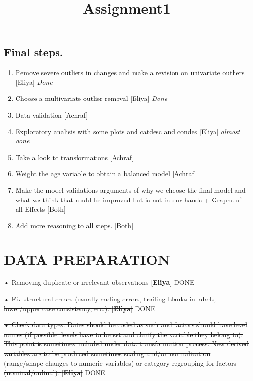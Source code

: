 \documentclass[
]{article}
\title{Assignment1}
\author{}
\date{\vspace{-2.5em}}
\providecommand{\tightlist}{%
  \setlength{\itemsep}{0pt}\setlength{\parskip}{0pt}}
\begin{document}
\maketitle

\hypertarget{final-steps.}{%
\subsection{Final steps.}\label{final-steps.}}

\begin{enumerate}
\def\labelenumi{\arabic{enumi}.}
\tightlist
\item
  Remove severe outliers in changes and make a revision on univariate
  outliers {[}Eliya{]} \emph{Done}
\item
  Choose a multivariate outlier removal {[}Eliya{]} \emph{Done}
\item
  Data validation {[}Achraf{]}
\item
  Exploratory analisis with some plots and catdesc and condes
  {[}Eliya{]} \emph{almost done}
\item
  Take a look to transformations {[}Achraf{]}
\item
  Weight the age variable to obtain a balanced model {[}Achraf{]}
\item
  Make the model validations arguments of why we choose the final model
  and what we think that could be improved but is not in our hands +
  Graphs of all Effects {[}Both{]}
\item
  Add more reasoning to all steps. {[}Both{]}
\end{enumerate}

\hypertarget{data-preparation}{%
\section{DATA PREPARATION}\label{data-preparation}}

• \sout{Removing duplicate or irrelevant observations
{[}\textbf{Eliya}{]}} DONE

• \sout{Fix structural errors (usually coding errors, trailing blanks in
labels, lower/upper case consistency, etc.). {[}\textbf{Eliya}{]}} DONE

\sout{• Check data types. Dates should be coded as such and factors
should have level names (if possible, levels have to be set and clarify
the variable they belong to). This point is sometimes included under
data transformation process. New derived variables are to be produced
sometimes scaling and/or normalization (range/shape changes to numeric
variables) or category regrouping for factors (nominal/ordinal).
{[}\textbf{Eliya}{]}} DONE
\end{document}
